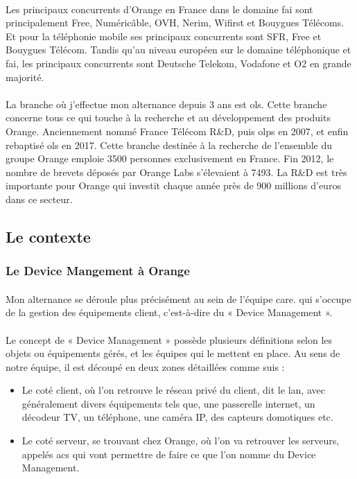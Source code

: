 \documentclass[12pt,a4paper]{report}
\begin{document}
\paragraph*{}
Les principaux concurrents d'Orange en France dans le domaine \gls{fai} sont principalement Free, Numéricâble, OVH, Nerim, Wifirst et Bouygues Télécoms. Et pour la téléphonie mobile ses principaux concurrents sont SFR, Free et Bouygues Télécom. Tandis qu'au niveau européen sur le domaine téléphonique et \gls{fai}, les principaux concurrents sont Deutsche Telekom, Vodafone et O2 en grande majorité.
\paragraph*{}
La branche où j’effectue mon alternance depuis 3 ans est \gls{ols}. Cette branche concerne tous ce qui touche à la recherche et au développement des produits Orange. Anciennement nommé France Télécom R\&D, puis \gls{olps} en 2007, et enfin rebaptisé \gls{ols} en 2017. Cette branche destinée à la recherche de l’ensemble du groupe Orange emploie 3500 personnes exclusivement en France. Fin 2012, le nombre de brevets déposés par Orange Labs s’élevaient à 7493. La R\&D est très importante pour Orange qui investit chaque année près de 900 millions d’euros dans ce secteur. \\

\subsection{Le contexte}
\subsubsection{Le Device Mangement à Orange}
\paragraph*{}
Mon alternance se déroule plus précisément au sein de l’équipe \gls{care}.  qui s’occupe de la gestion des équipements client, c’est-à-dire du « Device Management ».
\paragraph*{}
Le concept de « Device Management » possède plusieurs définitions selon les objets ou équipements gérés, et les équipes qui le mettent en place. Au sens de notre équipe, il est découpé en deux zones détaillées comme suis : 
\begin{itemize}
\subparagraph*{}
\item Le coté client, où l’on retrouve le réseau privé du client, dit le \gls{lan}, avec généralement divers équipements tels que, une passerelle internet, un décodeur TV, un téléphone, une caméra IP, des capteurs domotiques etc.
\item Le coté serveur, se trouvant chez Orange, où l’on va retrouver les serveurs, appelés \gls{acs} qui vont permettre de faire ce que l’on
nomme du Device Management.
\end{itemize}
\end{document}
